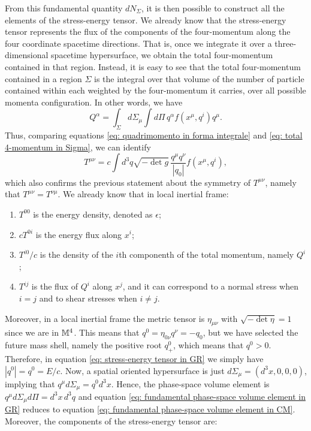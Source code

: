 From this fundamental quantity $dN_\Sigma$, it is then possible to construct all the elements of the stress-energy tensor. We already know that the stress-energy tensor represents the flux of the components of the four-momentum along the four coordinate spacetime directions. That is, once we integrate it over a three-dimensional spacetime hypersurface, we obtain the total four-momentum contained in that region. Instead, it is easy to see that the total four-momentum contained in a region $\Sigma$ is the integral over that volume of the number of particle contained within  each weighted by the four-momentum it carries, over all possible momenta configuration. In other words, we have 
\begin{equation}
\label{eq: total 4-momentum in Sigma}
    Q^\alpha = \int_\Sigma d\Sigma_\mu \int d\Pi\,q^\alpha f(x^\mu,q^i) q^\mu.
\end{equation}
Thus, comparing equations \eqref{eq: quadrimomento in forma integrale} and \eqref{eq: total 4-momentum in Sigma}, we can identify 
\begin{equation}
\label{eq: stress-energy tensor in GR}
    T^{\mu\nu} = c \int d^3q\sqrt{-\det{g}}\,\frac{q^\mu q^\nu}{|q_0|}f(x^\mu,q^i),
\end{equation}
which also confirms the previous statement about the symmetry of $T^{\mu\nu}$, namely that $T^{\mu\nu} = T^{\nu\mu}$.  We already know that in local inertial frame:
\begin{enumerate}
    \item $T^{00}$ is the energy density, denoted as $\epsilon$;
    \item $cT^{0i}$ is the energy flux along $x^i$;
    \item $T^{i0}/c$ is the density of the $i$th componenth of the total momentum, namely $Q^i$;
    \item $T^{ij}$ is the flux of $Q^i$ along $x^j$, and it can correspond to a normal stress when $i = j$ and to shear stresses when $i \neq j$. 
\end{enumerate}
Moreover, in a local inertial frame the metric tensor is $\eta_{\mu\nu}$ with $\sqrt{-\det{\eta}} = 1$ since we are in $\mathbb{M}^4$. This means that $q^0 = \eta_{0\nu}q^\nu = -q_0$, but we have selected the future mass shell, namely the positive root $q^0_+$, which means that $q^0 > 0$. Therefore, in equation \eqref{eq: stress-energy tensor in GR} we simply have $|q^0| = q^0 = E/c$. Now, a spatial oriented hypersurface is just $d\Sigma_\mu = (d^3x,0,0,0)$, implying that $q^\mu d\Sigma_\mu = q^0d^3x$. Hence, the phase-space volume element is $q^\mu d\Sigma_\mu d\Pi = d^3x\,d^3q$ and equation \eqref{eq: fundamental phase-space volume element in GR} reduces to equation \eqref{eq: fundamental phase-space volume element in CM}. Moreover, the components of the stress-energy tensor are: 
